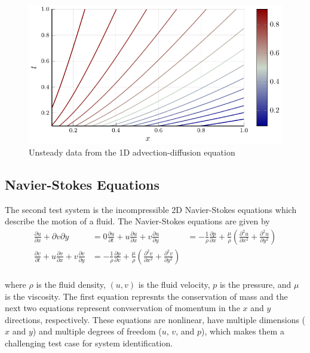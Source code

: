 \documentclass{article}
\begin{document}
\begin{figure}[ht]
\vskip 0.2in
\begin{center}
\centerline{\includegraphics[width=\columnwidth]{figures/advdif}}
\caption{Unsteady data from the 1D advection-diffusion equation}
\label{advdif}
\end{center}
\vskip -0.2in
\end{figure}

\subsection{Navier-Stokes Equations}
The second test system is the incompressible 2D Navier-Stokes equations which describe the motion of a fluid. The Navier-Stokes equations are given by
\begin{align}
  \frac{\partial u}{\partial x} + \partial{v}{\partial y} &= 0
  \frac{\partial u }{\partial t} + u \frac{\partial u }{\partial x} + v \frac{\partial u }{\partial y} &= - \frac{1}{\rho} \frac{\partial p}{\partial x} + \frac{\mu}{\rho}\left( \frac{\partial^2 u}{\partial x^2} + \frac{\partial^2 u}{\partial y^2} \right) \\
\frac{\partial v }{\partial t} + u \frac{\partial v }{\partial x} + v \frac{\partial v }{\partial y} &= - \frac{1}{\rho} \frac{\partial p}{\partial v} + \frac{\mu}{\rho}\left( \frac{\partial^2 v}{\partial x^2} + \frac{\partial^2 v}{\partial y^2} \right) \\
\end{align}

where $\rho$ is the fluid density, $(u, v)$ is the fluid velocity, $p$ is the pressure, and $\mu$ is the viscosity. The first equation represnts the conservation of mass and the next two equations represent convservation of momentum in the $x$ and $y$ directions, respectively. These equations are nonlinear, have multiple dimensions ($x$ and $y$) and multiple degrees of freedom ($u$, $v$, and $p$), which makes them a challenging test case for system identification.
\end{document}
